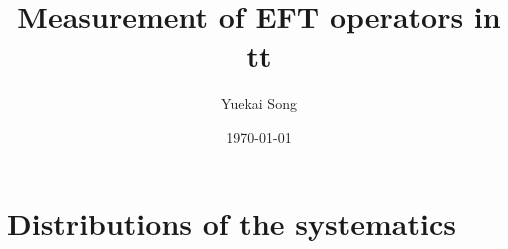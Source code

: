 \documentclass{beamer}
\title{Measurement of EFT operators in tt}
\author{Yuekai Song}
\institute{ZJU}
\date{\today}
\begin{document}
\frame{\titlepage}
\begin{frame}
    \begin{multicols}{3}
        \tableofcontents
    \end{multicols}
\end{frame}

\section{Distributions of the systematics}
\end{document}
